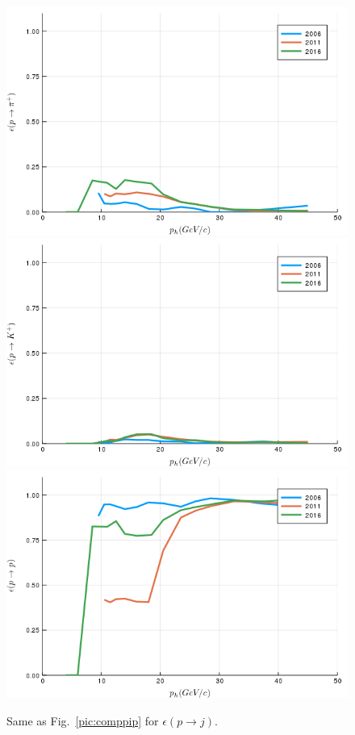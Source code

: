 \begin{figure}[!p]
  \centering
	\includegraphics[scale=0.35]{./gfx/t1/pp2pip.png}
  \includegraphics[scale=0.35]{./gfx/t1/pp2kp.png}
  \includegraphics[scale=0.35]{./gfx/t1/pp2pp.png}
	\caption{Same as Fig.~\ref{pic:comppip} for $\epsilon(p \rightarrow j)$.}
	\label{pic:comppp}
\end{figure}

